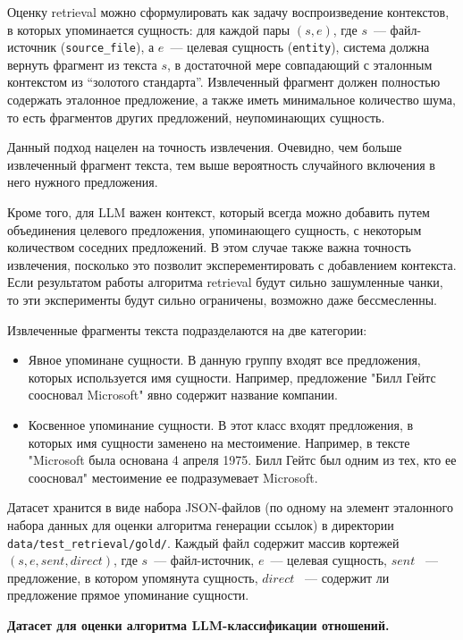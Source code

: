 Оценку retrieval можно сформулировать как задачу воспроизведение контекстов,
в которых упоминается сущность:
для каждой пары \((s, e)\), где \(s\)~--- файл-источник (\texttt{source\_file}),
а \(e\)~--- целевая сущность (\texttt{entity}),
система должна вернуть фрагмент из текста \(s\),
в достаточной мере совпадающий с эталонным контекстом из ``золотого стандарта''.
Извлеченный фрагмент должен полностью содержать эталонное предложение,
а также иметь минимальное количество шума,
то есть фрагментов других предложений, неупоминающих сущность.

Данный подход нацелен на точность извлечения.
Очевидно, чем больше извлеченный фрагмент текста,
тем выше вероятность случайного включения в него нужного предложения.

Кроме того, для LLM важен контекст, который всегда можно добавить путем объединения целевого предложения,
упоминающего сущность, с некоторым количеством соседних предложений.
В этом случае также важна точность извлечения, посколько это позволит эксперементировать с добавлением контекста.
Если результатом работы алгоритма retrieval будут сильно зашумленные чанки,
то эти эксперименты будут сильно ограничены, возможно даже бессмесленны.

Извлеченные фрагменты текста подразделаются на две категории:
\begin{itemize}
      \item Явное упоминане сущности. В данную группу входят все предложения, которых используется имя сущности.
            Например, предложение "Билл Гейтс соосновал Microsoft" явно содержит название компании.
      \item Косвенное упоминание сущности. В этот класс входят предложения,
            в которых имя сущности заменено на местоимение.
            Например, в тексте "Microsoft была основана 4 апреля 1975.
            Билл Гейтс был одним из тех, кто ее соосновал" местоимение ее подразумевает Microsoft.
\end{itemize}

Датасет хранится в виде набора JSON-файлов
(по одному на элемент эталонного набора данных для оценки алгоритма генерации ссылок)
в директории \texttt{data/test\_retrieval/gold/}.
Каждый файл содержит массив кортежей \((s, e, sent, direct)\), где \(s\)~--- файл-источник,
\(e\)~--- целевая сущность,
\(sent\) ~--- предложение, в котором упомянута сущность,
\(direct\) ~--- содержит ли предложение прямое упоминание сущности.

\textbf{Датасет для оценки алгоритма LLM-классификации отношений.}

